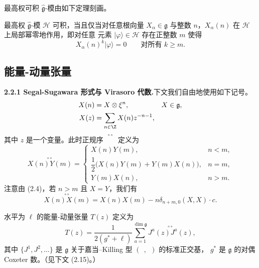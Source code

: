 最高权可积 $\hat{\mathfrak{g}}$-模由如下定理刻画。

\begin{theorem}[2.5]
最高权 $\hat{\mathfrak{g}}$-模 $\mathcal{H}$ 可积，当且仅当对任意根向量
$X_{\alpha}\in\mathfrak{g}$ 与整数 $n$，$X_{\alpha}(n)$ 在 $\mathcal{H}$ 上局部幂零地作用，即对任意
元素 $|\varphi\rangle\in\mathcal{H}$ 存在正整数 $m$ 使得
\[
X_{\alpha}(n)^{k}|\varphi\rangle=0\qquad\text{对所有 }k\ge m.
\]
\end{theorem}

\subsection{能量-动量张量}

\noindent\textbf{2.2.1 Segal-Sugawara 形式与 Virasoro 代数.}\quad 下文我们自由地使用如下记号。
\begin{align*}
X(n)&=X\otimes\xi^{n}, & X&\in\mathfrak{g},\\
X(z)&=\sum_{n\in\Z}X(n)z^{-n-1},
\end{align*}
其中 $z$ 是一个变量。此时正规序 $\overset{\circ\circ}{\phantom{XY}}$ 定义为
\[
\overset{\circ\circ}{X(n)Y(m)}=
\begin{cases}
X(n)Y(m), & n<m,\\[2pt]
\dfrac{1}{2}\big(X(n)Y(m)+Y(m)X(n)\big), & n=m,\\[6pt]
Y(m)X(n), & n>m.
\end{cases}
\]
注意由 (2.4)，若 $n>m$ 且 $X=Y$，我们有
\begin{equation}
\overset{\circ\circ}{X(n)X(m)}=X(n)X(m)-n\delta_{n+m,0}(X,X)\cdot c. \tag{2.11}
\end{equation}


\begin{definition}[2.6]
水平为 $\ell$ 的能量-动量张量 $T(z)$ 定义为
\[
T(z)=\frac{1}{2(g^*+\ell)}\sum_{a=1}^{\dim\mathfrak{g}}
\overset{\circ\circ}{J^{a}(z)J^{a}(z)},
\]
其中 $\{J^{1},J^{2},\dots\}$ 是 $\mathfrak{g}$ 关于嘉当--Killing 型 $(\;\,,\;\,)$ 的标准正交基，
$g^*$ 是 $\mathfrak{g}$ 的对偶 Coxeter 数。（见下文 (2.15)。）
\end{definition}

